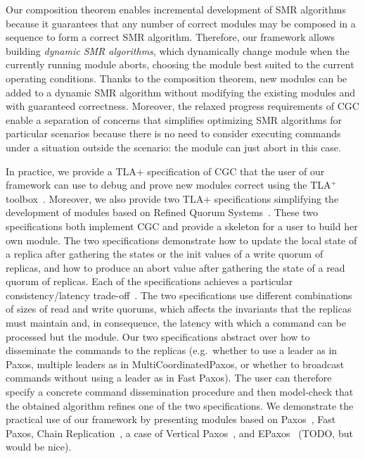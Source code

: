Our composition theorem enables incremental development of SMR algorithms
because it guarantees that any number of correct modules may be composed in
a sequence to form a correct SMR algorithm. Therefore, our framework allows
building \emph{dynamic SMR algorithms}, which dynamically change module when
the currently running module aborts, choosing the module best suited to the
current operating conditions. Thanks to the composition theorem, new modules can
be added to a dynamic SMR algorithm without modifying the existing modules and
with guaranteed correctness. Moreover, the relaxed progress requirements of CGC
enable a separation of concerns that simplifies optimizing SMR algorithms for
particular scenarios because there is no need to consider executing commands
under a situation outside the scenario: the module can just abort in this case.

In practice, we provide a TLA+ specification of CGC that the user of our framework can use to debug and prove new modules correct using the TLA$^+$ toolbox~\cite{TLATools}.
Moreover, we also provide two TLA+ specifications simplifying the development of modules based on Refined Quorum Systems~\cite{GuerraouiVukolic10RefinedQuorumSystems}. These two specifications both implement CGC and provide a skeleton for a user to build her own module. The two specifications demonstrate how to update the local state of a replica after gathering the states or the init values of a write quorum of replicas, and how to
produce an abort value after gathering the state of a read quorum of replicas. Each of the specifications achieves a particular consistency/latency trade-off~\cite{Abadi12ConsistencyTradeoffsModernDistributedDatabaseSystem}.
The two specifications use different combinations of sizes of read and write quorums, which affects the invariants that the replicas must maintain and, in consequence, the latency with which a command can be processed but the module.
Our two specifications abstract over how to disseminate the commands to the replicas (e.g.\ whether to use a leader as in Paxos, multiple leaders as in MultiCoordinatedPaxos, or whether to broadcast commands without using a leader as in Fast Paxos).
The user can therefore specify a concrete command dissemination procedure and then model-check that the obtained algorithm refines one of the two specifications.  
We demonstrate the practical use of our framework by presenting modules based on Paxos~\cite{Lamport98ParttimeParliament}, Fast Paxos\cite{Lamport06FastPaxos}, Chain Replication~\cite{RenesseSchneider04ChainReplicationSupportingHighThroughputAvailability}, a case of Vertical Paxos~\cite{LamportMalkhiZhou09VerticalPaxosPrimarybackupReplication}, and EPaxos~\cite{MoraruAndersenKaminsky13ThereIsMoreConsensusEgalitarianParliaments}
(TODO, but would be nice).

